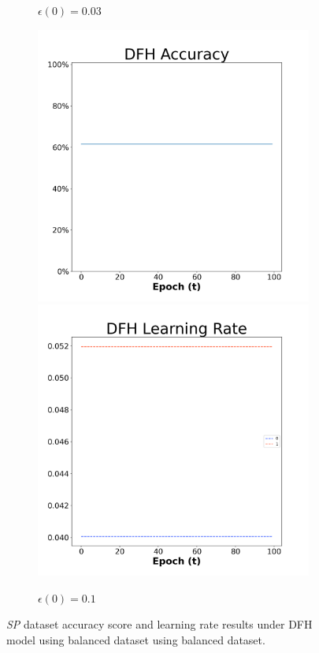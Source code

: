 \begin{figure}[H]
\begin{subfigure}{0.3\textwidth}
  \caption{$\epsilon(0)=0.03$}
\end{subfigure}\hfil %
\begin{subfigure}{0.3\textwidth}
  \includegraphics[width=\linewidth]{images/exper1/SP/DFH_0.1_acc.png}
  \includegraphics[width=\linewidth]{images/exper1/SP/DFH_0.1_lr.png}
  \caption{$\epsilon(0)=0.1$}
\end{subfigure}

\caption{\textit{SP} dataset accuracy score and learning rate results under DFH model using balanced dataset using balanced dataset.}
\end{figure}


